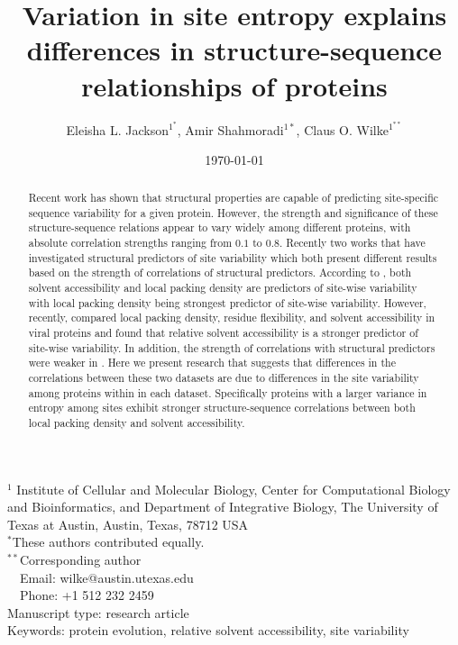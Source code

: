 \documentclass[12pt]{article}
\title{Variation in site entropy explains differences in structure-sequence relationships of proteins}
\author{Eleisha L. Jackson$^{1^*}$, Amir Shahmoradi$^{1*}$, Claus O. Wilke$^{1^{**}}$}
\begin{document}
\date{\today}
\maketitle


\noindent
$^1$ Institute of Cellular and Molecular Biology, Center for Computational Biology and Bioinformatics, and Department of Integrative Biology, The University of Texas at Austin, Austin, Texas, 78712 USA\\

\noindent $^{*}$These authors contributed equally. \\

\bigskip
\noindent
$^{**}$Corresponding author\\
$\phantom{^{** }}$Email: wilke@austin.utexas.edu\\
$\phantom{^{**}}$Phone: +1 512 232 2459\\

\bigskip
\noindent
Manuscript type: research article\\
\bigskip
\noindent  Keywords: protein evolution, relative solvent accessibility, site variability


\begin{abstract}
Recent work has shown that structural properties are capable of predicting site-specific sequence variability for a given protein. However, the strength and significance of these structure-sequence relations appear to vary widely among different proteins, with absolute correlation strengths ranging from $0.1$ to $0.8$. Recently two works that have investigated structural predictors of site variability which both present different results based on the strength of correlations of structural predictors. According to \cite{Yehetal2014a}, both solvent accessibility and local packing density are predictors of site-wise variability with local packing density being strongest predictor of site-wise variability. However, recently, \cite{Shahmoradietal2014} compared local packing density, residue flexibility, and solvent accessibility in viral proteins and found that relative solvent accessibility is a stronger predictor of site-wise variability. In addition, the strength of correlations with structural predictors were weaker in \cite{Shahmoradietal2014}.  Here we present research that suggests that differences in the correlations between these two datasets are due to differences in the site variability among proteins within in each dataset. Specifically proteins with a larger variance in entropy among sites exhibit stronger structure-sequence correlations between both local packing density and solvent accessibility. 
\end{abstract}
\vfill
\vfill
\def\thefootnote{\fnsymbol{footnote}}
\setcounter{footnote}{0}
\end{document}

